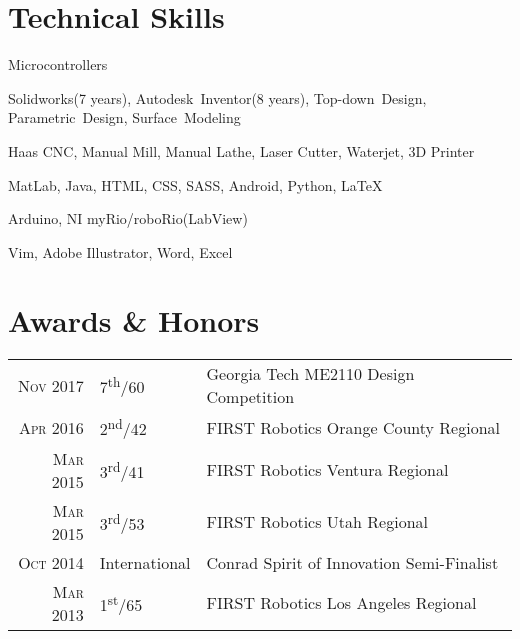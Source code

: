 \documentclass{resume}
\begin{document}
\section{Technical Skills}
\begin{skills}{Microcontrollers}
  \item [CAD] Solidworks(7 years), Autodesk~Inventor(8 years), Top-down~Design, Parametric~Design, Surface~Modeling
  \item [Manufacturing] Haas CNC, Manual Mill, Manual Lathe, Laser Cutter, Waterjet, 3D Printer
  \item [Programming] MatLab, Java, HTML, CSS, SASS, Android, Python, \LaTeX
  \item [Microcontrollers] Arduino, NI myRio/roboRio(LabView)
  \item [Software] Vim, Adobe Illustrator, Word, Excel
\end{skills}

\section{Awards \& Honors}
\begin{tabular}{rll}
  \textsc{Nov} 2017 & 7\textsuperscript{th}/60 & Georgia Tech ME2110 Design Competition\\
  \textsc{Apr} 2016 & 2\textsuperscript{nd}/42 & FIRST Robotics Orange County Regional\\
  \textsc{Mar} 2015 & 3\textsuperscript{rd}/41 & FIRST Robotics Ventura Regional\\
  \textsc{Mar} 2015 & 3\textsuperscript{rd}/53 & FIRST Robotics Utah Regional\\
  \textsc{Oct} 2014 & International & Conrad Spirit of Innovation Semi-Finalist\\
  \textsc{Mar} 2013 & 1\textsuperscript{st}/65 & FIRST Robotics Los Angeles Regional\\
\end{tabular}
\end{document}
